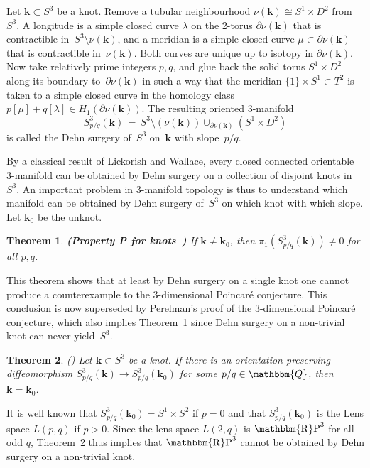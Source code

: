 \documentclass[12pt,twoside]{amsart}
\theoremstyle{plain}
\newtheorem{theorem}{Theorem}[section]
\numberwithin{figure}{section}
\numberwithin{equation}{section}
\def\m{\medskip}
\def\kk{\boldsymbol{k}}
\def\QQ{\mathbbm{Q}}
\def\RP{\operatorname{\mathbbm{R}P}}
\def\pp{\partial}
\def\m{\medskip}
\begin{document}
\m
Let $\kk \subset S^3$ be a knot.
Remove a tubular neighbourhood $\nu(\kk) \cong S^1 \times D^2$ from $S^3$.
A longitude is a simple closed curve $\lambda$ on the 2-torus $\pp \nu (\kk)$ 
that is contractible in~$S^3 \setminus \nu (\kk)$, 
and a meridian is a simple closed curve $\mu \subset \pp \nu (\kk)$ 
that is contractible in~$\nu (\kk)$.
Both curves are unique up to isotopy in $\pp \nu (\kk)$. 
Now take relatively prime integers $p,q$, and glue back 
the solid torus $S^1 \times D^2$ along its boundary to~$\pp \nu (\kk)$
in such a way that the meridian $\{1\} \times S^1 \subset T^2$ 
is taken to a simple closed curve in the homology
class $p [\mu] + q [\lambda] \in H_1(\pp \nu (\kk))$.
The resulting oriented 3-manifold 
$$
S^3_{p/q}(\kk) \,=\, S^3 \setminus (\nu (\kk)) \cup_{\pp \nu (\kk)} (S^1 \times D^2) 
$$
is called the Dehn surgery of~$S^3$ on~$\kk$ with slope~$p/q$.

By a classical result of Lickorish and Wallace, every closed connected orientable 3-manifold can be obtained
by Dehn surgery on a collection of disjoint knots in~$S^3$. 
An important problem in 3-manifold topology is thus to understand which manifold can 
be obtained by Dehn surgery of~$S^3$ on which knot with which slope.
Let $\kk_0$ be the unknot. 

\begin{theorem} \label{t:P}
{\rm \bf (Property P for knots~\cite{KrMr04})}
If $\kk \neq \kk_0$, then $\pi_1 (S^3_{p/q}(\kk)) \neq 0$ for all $p,q$.
\end{theorem}

This theorem shows that at least by Dehn surgery on a single knot one cannot produce
a counterexample to the 3-dimensional Poincar\'e conjecture.
This conclusion is now superseded by Perelman's proof of the 3-dimensional Poincar\'e conjecture,
which also implies Theorem~\ref{t:P} 
since Dehn surgery on a non-trivial knot can never yield~$S^3$.


\begin{theorem} \label{t:KMO}
{\rm (\cite{KMOS07})}
Let $\kk \subset S^3$ be a knot. 
If there is an orientation preserving diffeomorphism $S^3_{p/q} (\kk) \to S^3_{p/q} (\kk_0)$
for some $p/q \in \QQ$, then $\kk = \kk_0$.
\end{theorem}

It is well known that $S^3_{p/q} (\kk_0) = S^1 \times S^2$ if $p=0$
and that $S^3_{p/q} (\kk_0)$ is the Lens space $L(p,q)$ if $p>0$. 
Since the lens space $L(2,q)$ is $\RP^3$ for all odd $q$, Theorem~\ref{t:KMO} thus implies 
that $\RP^3$ cannot be obtained by Dehn surgery on a non-trivial knot.
\end{document}
